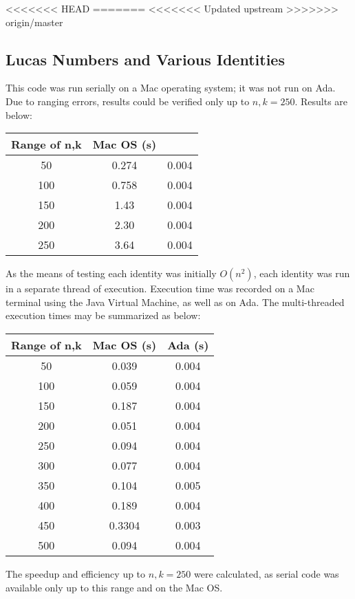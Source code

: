 \documentclass[11pt]{article}
\begin{document}
<<<<<<< HEAD
=======
<<<<<<< Updated upstream
>>>>>>> origin/master
\subsection{Lucas Numbers and Various Identities}
This code was run serially on a Mac operating system; it was not run on Ada. Due to ranging errors, results could be verified only up to $n,k=250$. Results are below:
\begin{tabular}{ccc}
\hline
 Range of n,k & Mac OS (s)  \\ \hline
50 & 0.274 & 0.004\\
100 & 0.758 & 0.004 \\
150 & 1.43 & 0.004 \\
200 & 2.30 & 0.004 \\
250 & 3.64 & 0.004 \\ 
\hline \hline
\end{tabular}
As the means of testing each identity was initially $O(n^{2})$, each identity was run in a separate thread of execution. Execution time was recorded on a Mac terminal using the Java Virtual Machine, as well as on Ada. The multi-threaded execution times may be summarized as below:\\
\begin{tabular}{ccc}
\hline
 Range of n,k & Mac OS (s) & Ada (s) \\ \hline
50 & 0.039 & 0.004\\
100 & 0.059 & 0.004 \\
150 & 0.187 & 0.004 \\
200 & 0.051 & 0.004 \\
250 & 0.094 & 0.004 \\ 
300 & 0.077 & 0.004 \\
350 & 0.104 & 0.005 \\
400 & 0.189 & 0.004 \\
450 & 0.3304 & 0.003 \\
500 & 0.094 &0.004 \\ \hline \hline
\end{tabular}

The speedup and efficiency up to $n,k=250$ were calculated, as serial code was available only up to this range and on the Mac OS.
\end{document}
